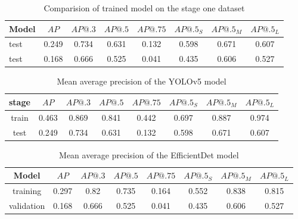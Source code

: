 \begin{table}
    \centering
    \begin{tabular}{l|c|c|c|c|c|c|c}
        Model & $AP$  & $AP@.3$ & $AP@.5$ & $AP@.75$ & $AP@.5_S$ & $AP@.5_M$ & $AP@.5_L$ \\ \hline
        test  & 0.249 & 0.734   & 0.631   & 0.132    & 0.598     & 0.671     & 0.607     \\
        test  & 0.168 & 0.666   & 0.525   & 0.041    & 0.435     & 0.606     & 0.527     \\
    \end{tabular}
    \caption{Comparision of trained model on the stage one dataset}
    \label{tab:model_results:stage_three:test}
\end{table}



\begin{table}
    \begin{tabular}{c|c|c|c|c|c|c|c}
        stage & $AP$  & $AP@.3$ & $AP@.5$ & $AP@.75$ & $AP@.5_S$ & $AP@.5_M$ & $AP@.5_L$ \\ \hline
        train & 0.463 & 0.869   & 0.841   & 0.442    & 0.697     & 0.887     & 0.974     \\ \hline
        test  & 0.249 & 0.734   & 0.631   & 0.132    & 0.598     & 0.671     & 0.607     \\
    \end{tabular}
    \caption{Mean average precision of the YOLOv5 model}
    \label{tab:yolov5_basic}
\end{table}

\begin{table}
    \begin{tabular}{c|c|c|c|c|c|c|c}
        Model      & $AP$  & $AP@.3$ & $AP@.5$ & $AP@.75$ & $AP@.5_S$ & $AP@.5_M$ & $AP@.5_L$ \\ \hline
        training   & 0.297 & 0.82    & 0.735   & 0.164    & 0.552     & 0.838     & 0.815     \\ \hline
        validation & 0.168 & 0.666   & 0.525   & 0.041    & 0.435     & 0.606     & 0.527     \\
    \end{tabular}
    \caption{Mean average precision of the EfficientDet model}
    \label{tab:effdet_basic}
\end{table}

